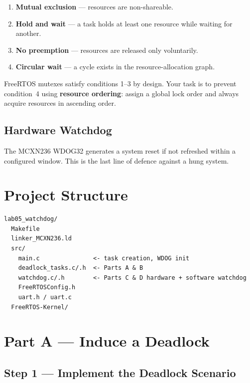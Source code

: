 \documentclass[11pt, a4paper]{article}
\begin{document}
\begin{enumerate}[noitemsep, leftmargin=*]
  \item \textbf{Mutual exclusion} --- resources are non-shareable.
  \item \textbf{Hold and wait} --- a task holds at least one resource while waiting for
        another.
  \item \textbf{No preemption} --- resources are released only voluntarily.
  \item \textbf{Circular wait} --- a cycle exists in the resource-allocation graph.
\end{enumerate}

FreeRTOS mutexes satisfy conditions 1--3 by design. Your task is to prevent condition~4
using \textbf{resource ordering}: assign a global lock order and always acquire resources
in ascending order.

\subsection{Hardware Watchdog}

The MCXN236 WDOG32 generates a system reset if not refreshed within a configured window.
This is the last line of defence against a hung system.

\section{Project Structure}

\begin{lstlisting}[style=textstyle]
lab05_watchdog/
  Makefile
  linker_MCXN236.ld
  src/
    main.c               <- task creation, WDOG init
    deadlock_tasks.c/.h  <- Parts A & B
    watchdog.c/.h        <- Parts C & D hardware + software watchdog
    FreeRTOSConfig.h
    uart.h / uart.c
  FreeRTOS-Kernel/
\end{lstlisting}

\section{Part A --- Induce a Deadlock}

\subsection{Step 1 --- Implement the Deadlock Scenario}
\end{document}
